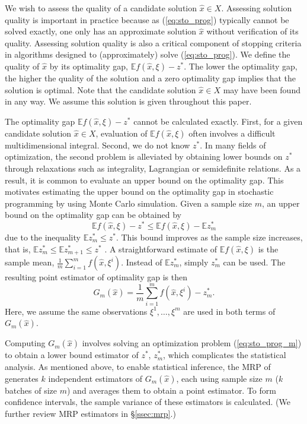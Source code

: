 \documentclass[12pt]{article}
\newcommand{\e}[1]{\mathbb{E} %
#1 %
}
\newcommand{\x}{x}
\newcommand{\xh}{{\hat{\x}}}
\newcommand{\xit}{\xi}
\newcommand{\xiti}{\xit^i}
\newcommand{\zs}{z^*}
\begin{document}
We wish to assess the quality of a candidate solution $\xh \in X$. 
Assessing solution quality is important in practice because as (\ref{eq:sto_prog}) typically cannot be solved exactly, one only has an approximate solution $\xh$ without verification of its quality.
Assessing solution quality is also a critical component of stopping criteria in algorithms designed to (approximately) solve (\ref{eq:sto_prog}).
We define the quality of $\xh$ by its optimality gap, $\e{f(\xh,\xit)} - \zs$. 
The lower the optimality gap, the higher the quality of the solution and a zero optimality gap implies that the solution is optimal. 
Note that the candidate solution $\xh \in X$ may have been found in any way. 
We assume this solution is given throughout this paper. 


The optimality gap $\e{f(\xh,\xit)} - \zs$ cannot be calculated exactly. First,  for a given candidate solution $\xh \in X$, evaluation of $\e{f(\xh,\xit)}$ often involves a difficult multidimensional integral. 
Second, we do not know $\zs$. 
In many fields of optimization, the second problem is alleviated by obtaining lower bounds on $\zs$ through relaxations such as integrality, Lagrangian or semidefinite relations.
As a result, it is common to evaluate an upper bound on the optimality gap. 
This motivates estimating the upper bound on the optimality gap in stochastic programming by using Monte Carlo simulation.
Given a sample size $m$, an upper bound on the optimality gap can be obtained by $$
\e{f(\xh,\xit)} - \zs \leq \e{f(\xh,\xit)} - \e{\zs_m}
$$ 
due to the inequality $\e{\zs_m} \leq \zs$.
This bound improves as the sample size increases, that is, $\e{\zs_m} \leq \e{\zs_{m+1}} \leq \zs$ \citep{Mak1999,norkin_pflug_ruszczynski_98}.  
A straightforward estimate of $\e{f(\xh,\xit)}$ is the sample mean, $\frac{1}{m} \sum_{i=1}^m f(\xh,\xiti)$. 
Instead of $\e{\zs_m}$, simply $\zs_m$ can be used.  
The resulting point estimator of optimality gap is then 
$$
G_m(\xh) = \frac{1}{m} \sum_{i=1}^m f(\xh,\xiti) - \zs_m.
$$ 
Here, we assume the same observations $\xit^1, \dots, \xit^m$ are used in both terms of $G_m(\xh)$.  

Computing $G_m(\xh)$ involves solving an optimization problem (\ref{eq:sto_prog_m}) to obtain a lower bound estimator of $\zs$, $\zs_m$, which complicates the statistical analysis. 
As mentioned above, to enable statistical inference, the MRP of \citet{Mak1999} generates $k$ independent estimators of $G_m(\xh)$, each using sample size $m$ ($k$ batches of size $m$) and averages them to obtain a point estimator.  
To form confidence intervals, the sample variance of these estimators is calculated.  
(We further review MRP estimators in \S \ref{ssec:mrp}.)
\end{document}
